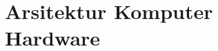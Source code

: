 \documentclass{WileySix}
\begin{document}
\part[Hardware dan Networking]
{Arsitektur Komputer\\ Hardware}

%

%

%

%

%






\end{document}
